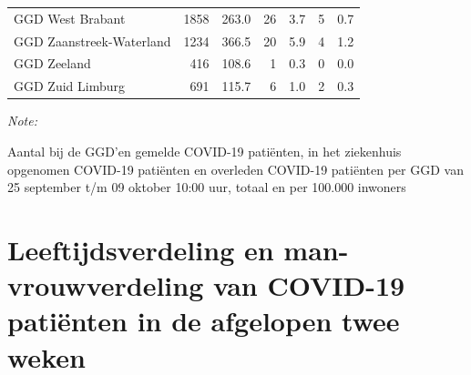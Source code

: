 \documentclass[
  english,
  man,floatsintext]{apa6}
\begin{document}
\begin{table}[H]
\begin{threeparttable}
\begin{tabular}{lrrrrrr}
GGD West Brabant & 1858 & 263.0 & 26 & 3.7 & 5 & 0.7\\
GGD Zaanstreek-Waterland & 1234 & 366.5 & 20 & 5.9 & 4 & 1.2\\
GGD Zeeland & 416 & 108.6 & 1 & 0.3 & 0 & 0.0\\
GGD Zuid Limburg & 691 & 115.7 & 6 & 1.0 & 2 & 0.3\\
\bottomrule
\end{tabular}
\begin{tablenotes}
\item \textit{Note: } 
\item Aantal bij de GGD’en gemelde COVID-19 patiënten, in het ziekenhuis opgenomen COVID-19 patiënten en overleden COVID-19 patiënten per GGD van 25 september t/m 09 oktober 10:00 uur, totaal en per 100.000 inwoners
\end{tablenotes}
\end{threeparttable}
\endgroup{}
\end{table}

\newpage

\hypertarget{leeftijdsverdeling-en-man-vrouwverdeling-van-covid-19-patiuxebnten-in-de-afgelopen-twee-weken}{%
\section{Leeftijdsverdeling en man-vrouwverdeling van COVID-19 patiënten in de afgelopen twee weken}\label{leeftijdsverdeling-en-man-vrouwverdeling-van-covid-19-patiuxebnten-in-de-afgelopen-twee-weken}}
\end{document}
